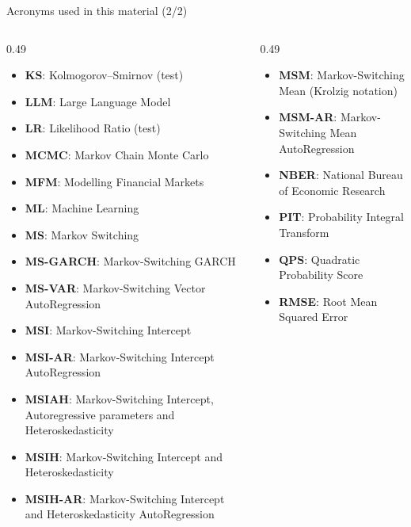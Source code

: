 \begin{frame}{Acronyms used in this material (2/2)}
\begin{columns}[T]
\begin{column}{0.49\textwidth}
\begin{itemize}\setlength{\itemsep}{0pt}
    \item \textbf{KS}: Kolmogorov–Smirnov (test)
    \item \textbf{LLM}: Large Language Model
    \item \textbf{LR}: Likelihood Ratio (test)
    \item \textbf{MCMC}: Markov Chain Monte Carlo
    \item \textbf{MFM}: Modelling Financial Markets
    \item \textbf{ML}: Machine Learning
    \item \textbf{MS}: Markov Switching
    \item \textbf{MS-GARCH}: Markov-Switching GARCH
    \item \textbf{MS-VAR}: Markov-Switching Vector AutoRegression
    \item \textbf{MSI}: Markov-Switching Intercept
    \item \textbf{MSI-AR}: Markov-Switching Intercept AutoRegression
    \item \textbf{MSIAH}: Markov-Switching Intercept, Autoregressive parameters and Heteroskedasticity
    \item \textbf{MSIH}: Markov-Switching Intercept and Heteroskedasticity
    \item \textbf{MSIH-AR}: Markov-Switching Intercept and Heteroskedasticity AutoRegression
\end{itemize}
\end{column}
\begin{column}{0.49\textwidth}
\begin{itemize}\setlength{\itemsep}{0pt}
    \item \textbf{MSM}: Markov-Switching Mean (Krolzig notation)
    \item \textbf{MSM-AR}: Markov-Switching Mean AutoRegression
    \item \textbf{NBER}: National Bureau of Economic Research
    \item \textbf{PIT}: Probability Integral Transform
    \item \textbf{QPS}: Quadratic Probability Score
    \item \textbf{RMSE}: Root Mean Squared Error

\end{itemize}
\end{column}
\end{columns}
\end{frame}
